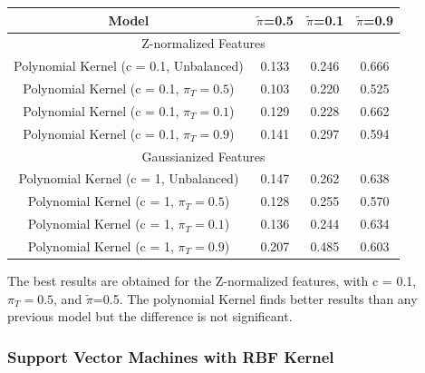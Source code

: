 \documentclass[12pt,a4paper]{article}
\begin{document}
\renewcommand{\arraystretch}{1.2}
\begin{tabular}{@{}cccc@{}}
    Model                                      & \(\tilde{\pi}\)=0.5  & \(\tilde{\pi}\)=0.1  & \(\tilde{\pi}\)=0.9  \\ [0.5ex]

    \hline
    \multicolumn{4}{c}{Z-normalized Features}                                                                       \\
    \hline
    Polynomial Kernel (c = 0.1, Unbalanced)    & 0.133                & 0.246                & 0.666                \\
    Polynomial Kernel (c = 0.1, $\pi_T = 0.5$) & {\color{red} 0.103 } & {\color{red} 0.220 } & {\color{red} 0.525 } \\
    Polynomial Kernel (c = 0.1, $\pi_T = 0.1$) & 0.129                & 0.228                & 0.662                \\
    Polynomial Kernel (c = 0.1, $\pi_T = 0.9$) & 0.141                & 0.297                & 0.594                \\

    \hline
    \multicolumn{4}{c}{Gaussianized Features}                                                                       \\
    \hline
    Polynomial Kernel (c = 1, Unbalanced)      & 0.147                & 0.262                & 0.638                \\
    Polynomial Kernel (c = 1, $\pi_T = 0.5$)   & 0.128                & 0.255                & 0.570                \\
    Polynomial Kernel (c = 1, $\pi_T = 0.1$)   & 0.136                & 0.244                & 0.634                \\
    Polynomial Kernel (c = 1, $\pi_T = 0.9$)   & 0.207                & 0.485                & 0.603                \\
\end{tabular}

\vspace*{10pt}
The best results are obtained for the Z-normalized features, with c = 0.1, \(\pi_T = 0.5\), and \(\tilde{\pi}\)=0.5.
The polynomial Kernel finds better results than any previous model but the difference is not significant.

\subsubsection{Support Vector Machines with RBF Kernel}
\end{document}
